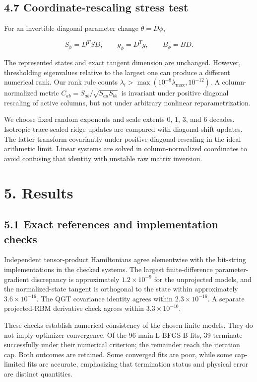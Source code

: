 \documentclass[
  11pt,
  a4paper,
]{article}
\begin{document}
\hypertarget{coordinate-rescaling-stress-test}{%
\subsection{4.7 Coordinate-rescaling stress
test}\label{coordinate-rescaling-stress-test}}

For an invertible diagonal parameter change \(\theta=D\phi\),

\[S_\phi=D^TSD,\qquad g_\phi=D^Tg,\qquad B_\phi=BD.\]

The represented states and exact tangent dimension are unchanged.
However, thresholding eigenvalues relative to the largest one can
produce a different numerical rank. Our rank rule counts
\(\lambda_i>\max(10^{-8}\lambda_{\max},10^{-12})\). A column-normalized
metric \(C_{ab}=S_{ab}/\sqrt{S_{aa}S_{bb}}\) is invariant under positive
diagonal rescaling of active columns, but not under arbitrary nonlinear
reparametrization.

We choose fixed random exponents and scale extents 0, 1, 3, and 6
decades. Isotropic trace-scaled ridge updates are compared with
diagonal-shift updates. The latter transform covariantly under positive
diagonal rescaling in the ideal arithmetic limit. Linear systems are
solved in column-normalized coordinates to avoid confusing that identity
with unstable raw matrix inversion.

\hypertarget{results}{%
\section{5. Results}\label{results}}

\hypertarget{exact-references-and-implementation-checks}{%
\subsection{5.1 Exact references and implementation
checks}\label{exact-references-and-implementation-checks}}

Independent tensor-product Hamiltonians agree elementwise with the
bit-string implementations in the checked systems. The largest
finite-difference parameter-gradient discrepancy is approximately
\(1.2\times10^{-9}\) for the unprojected models, and the
normalized-state tangent is orthogonal to the state within approximately
\(3.6\times10^{-16}\). The QGT covariance identity agrees within
\(2.3\times10^{-16}\). A separate projected-RBM derivative check agrees
within \(3.3\times10^{-10}\).

These checks establish numerical consistency of the chosen finite
models. They do not imply optimizer convergence. Of the 96 main L-BFGS-B
fits, 39 terminate successfully under their numerical criterion; the
remainder reach the iteration cap. Both outcomes are retained. Some
converged fits are poor, while some cap-limited fits are accurate,
emphasizing that termination status and physical error are distinct
quantities.
\end{document}
